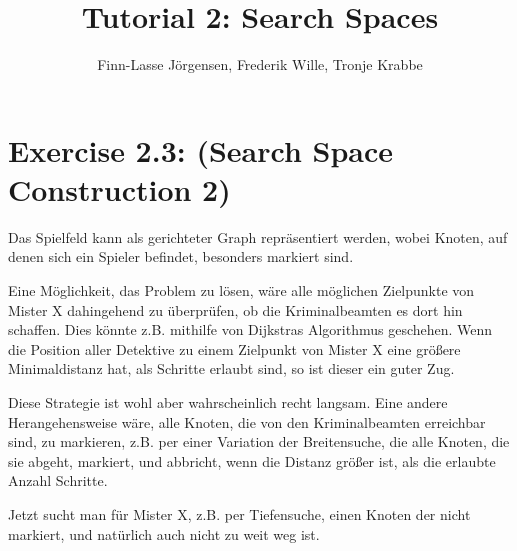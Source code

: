 \documentclass[12pt,a4paper]{article}
\author{Finn-Lasse Jörgensen, Frederik Wille, Tronje Krabbe}
\title{Tutorial 2: Search Spaces}
\begin{document}
\maketitle


\section*{Exercise 2.3: (Search Space Construction 2)} %
Das Spielfeld kann als gerichteter Graph repräsentiert werden,
wobei Knoten, auf denen sich ein Spieler befindet, besonders
markiert sind.

Eine Möglichkeit, das Problem zu lösen, wäre alle möglichen Zielpunkte
von Mister X dahingehend zu überprüfen, ob die Kriminalbeamten
es dort hin schaffen. Dies könnte z.B. mithilfe von Dijkstras
Algorithmus geschehen. Wenn die Position aller Detektive zu einem
Zielpunkt von Mister X eine größere Minimaldistanz hat,
als Schritte erlaubt sind, so ist dieser ein guter Zug.

Diese Strategie ist wohl aber wahrscheinlich recht langsam.
Eine andere Herangehensweise wäre, alle Knoten, die von
den Kriminalbeamten erreichbar sind, zu markieren, z.B.
per einer Variation der Breitensuche, die alle Knoten, die sie abgeht,
markiert, und abbricht, wenn die Distanz größer ist, als
die erlaubte Anzahl Schritte.

Jetzt sucht man für Mister X, z.B. per Tiefensuche,
einen Knoten der nicht markiert, und natürlich auch nicht zu
weit weg ist.
\end{document}
